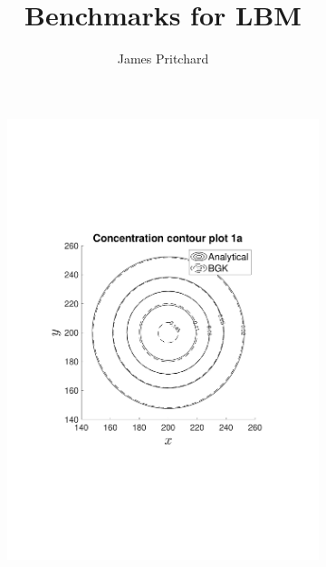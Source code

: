 \documentclass[11pt]{article}   	%
\title{Benchmarks for LBM}
\author{James Pritchard}
\begin{document}
\maketitle

\begin{figure}
\centering
\begin{subfigure}{0.5\textwidth}
  \centering
  \includegraphics[width=1.2\linewidth]{concentration_contour_benchmark_1a}
\end{subfigure}%
\begin{subfigure}{0.5\textwidth}

\end{subfigure}
\end{figure}
\end{document}
